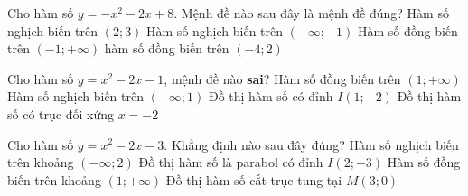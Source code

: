 \begin{ex}%
	Cho hàm số $y=-x^2-2x+8$. Mệnh đề nào sau đây là mệnh đề đúng?
	\choice
	{\True Hàm số nghịch biến trên $(2;3)$}
	{Hàm số nghịch biến trên $(-\infty;-1)$}
	{Hàm số đồng biến trên $(-1;+\infty)$}
	{hàm số đồng biến trên $(-4;2)$}
\end{ex}
\begin{ex}%
	Cho hàm số $y=x^2-2x-1$, mệnh đề nào \textbf{sai}?
	\choice
	{Hàm số đồng biến trên $(1;+\infty)$}
	{Hàm số nghịch biến trên $(-\infty;1)$}
	{Đồ thị hàm số có đỉnh $I(1;-2)$}
	{\True Đồ thị hàm số có trục đối xứng $x=-2$}
\end{ex}
\begin{ex}%
	Cho hàm số $y=x^2-2x-3$. Khẳng định nào sau đây đúng?
	\choice
	{Hàm số nghịch biến trên khoảng $(-\infty;2)$}
	{Đồ thị hàm số là parabol có đỉnh $I(2;-3)$}
	{\True Hàm số đồng biến trên khoảng $(1;+\infty)$}
	{Đồ thị hàm số cắt trục tung tại $M(3;0)$}
\end{ex}

